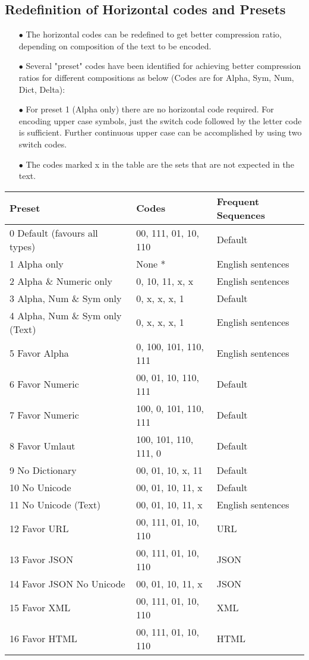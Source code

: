 \documentclass[]{article}
\begin{document}
\subsection{Redefinition of Horizontal codes and Presets}
\begin{itemize}
	\item[$\bullet$] The horizontal codes can be redefined to get better compression ratio, depending on composition of the text to be encoded.
	\item[$\bullet$] Several "preset" codes have been identified for achieving better compression ratios for different compositions as below (Codes are for Alpha, Sym, Num, Dict, Delta):
	\item[$\bullet$] For preset 1 (Alpha only) there are no horizontal code required.  For encoding upper case symbols, just the switch code followed by the letter code is sufficient.  Further continuous upper case can be accomplished by using two switch codes.
	\item[$\bullet$] The codes marked x in the table are the sets that are not expected in the text.
\end{itemize}
\begin{tabular}{ | l | l | l |} \hline
	﻿\textbf{Preset} & ﻿\textbf{Codes} & \textbf{Frequent Sequences} \\ \hline
	0 Default (favours all types) & 00, 111, 01, 10, 110 & Default \\ \hline
	1 Alpha only & None * & English sentences \\ \hline
	2 Alpha \& Numeric only & 0, 10, 11, x, x & English sentences \\ \hline
	3 Alpha, Num \& Sym only & 0, x, x, x, 1 & Default \\ \hline
	4 Alpha, Num \& Sym only (Text) & 0, x, x, x, 1 & English sentences \\ \hline
	5 Favor Alpha & 0, 100, 101, 110, 111 & English sentences \\ \hline
	6 Favor Numeric & 00, 01, 10, 110, 111 & Default \\ \hline
	7 Favor Numeric & 100, 0, 101, 110, 111 & Default \\ \hline
	8 Favor Umlaut & 100, 101, 110, 111, 0 & Default \\ \hline
	9 No Dictionary & 00, 01, 10, x, 11 & Default \\ \hline
	10 No Unicode & 00, 01, 10, 11, x & Default \\ \hline
	11 No Unicode (Text) & 00, 01, 10, 11, x & English sentences \\ \hline
	12 Favor URL & 00, 111, 01, 10, 110 & URL \\ \hline
	13 Favor JSON & 00, 111, 01, 10, 110 & JSON \\ \hline
	14 Favor JSON No Unicode & 00, 01, 10, 11, x & JSON \\ \hline
	15 Favor XML & 00, 111, 01, 10, 110 & XML \\ \hline
	16 Favor HTML & 00, 111, 01, 10, 110 & HTML \\ \hline
\end{tabular}
\end{document}
